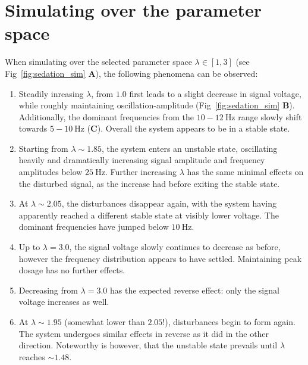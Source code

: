 \section{Simulating over the parameter space}

When simulating over the selected parameter space $ \lambda \in \left[ 1, 3 \right] $ (see Fig~\ref{fig:sedation_sim}
\textbf{A}),
the following phenomena can be observed:

\begin{enumerate}
    \item Steadily inreasing $ \lambda $, from $1.0$ first leads to a slight decrease in signal voltage, while roughly
    maintaining
    oscillation-amplitude (Fig~\ref{fig:sedation_sim} \textbf{B}).
    Additionally, the dominant frequencies from the $ 10-12 \SI{}{\hertz} $ range slowly shift towards $ 5-10
    \SI{}{\hertz} $ (\textbf{C}).
    Overall the system appears to be in a stable state.

    \item Starting from $ \lambda \sim 1.85 $, the system enters an unstable state, oscillating heavily and dramatically
    increasing signal amplitude and frequency amplitudes below $ \SI{25}{\hertz} $.
    Further increasing $\lambda$ has the same minimal effects on the disturbed signal,
    as the increase had before exiting the stable state.

    \item At $\lambda \sim 2.05 $, the disturbances disappear again, with the system having apparently reached a different
    stable state at visibly lower voltage.
    The dominant frequencies have jumped below $\SI{10}{\hertz}$.

    \item Up to $\lambda = 3.0$, the signal voltage slowly continues to decrease as before,
    however the frequency distribution appears to have settled.
    Maintaining peak dosage has no further effects.

    \item Decreasing from $\lambda = 3.0$ has the expected reverse effect: only the signal voltage increases as well.

    \item At $\lambda \sim 1.95$ (somewhat lower than $2.05$!), disturbances begin to form again.
    The system undergoes similar effects in reverse as it did in the other direction.
    Noteworthy is however, that the unstable state prevails until $\lambda$ reaches $\sim 1.48$.
\end{enumerate}




